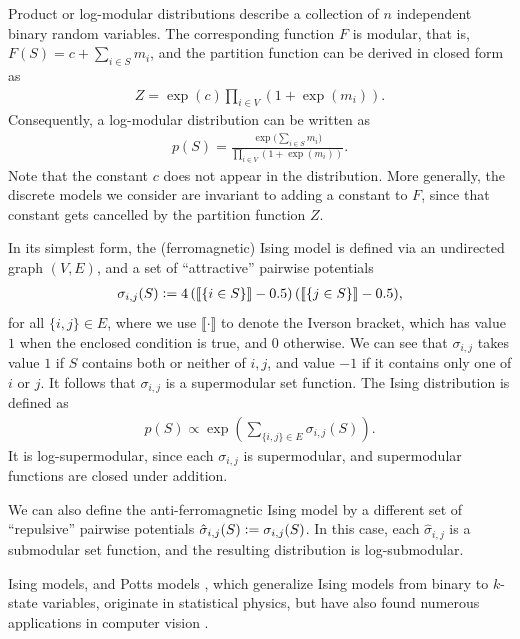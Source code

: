 \begin{example}
Product or log-modular distributions describe a collection of $n$ independent binary random variables.
The corresponding function $F$ is modular, that is, $F(S) = c + \sum_{i \in S} m_i$, and the partition function can be derived in closed form as
\begin{align*}
Z = \exp(c) \prod_{i \in V} \left( 1 + \exp(m_i) \right).
\end{align*}
Consequently, a log-modular distribution can be written as
\begin{align*}
  p(S) = \frac{\exp\big( \sum_{i \in S} m_i \big)}{\prod_{i \in V} \left( 1 + \exp(m_i) \right)}.
\end{align*}
Note that the constant $c$ does not appear in the distribution.
More generally, the discrete models we consider are invariant to adding a constant to $F$, since that constant gets cancelled by the partition function $Z$.
\end{example}

\begin{example}
In its simplest form, the (ferromagnetic) Ising model \citep{ising} is defined via an undirected graph $(V, E)$, and a set of ``attractive'' pairwise potentials
\begin{align*}
\sigma_{i,j}(S) \vcentcolon= 4\left(\llbracket\{i \in S\}\rrbracket - 0.5\right)(\llbracket\{j \in S\}\rrbracket - 0.5),
\end{align*}
for all $\{i, j\} \in E$, where we use $\llbracket \cdot \rrbracket$ to denote the Iverson bracket, which has value $1$ when the enclosed condition is true, and $0$ otherwise.
We can see that $\sigma_{i,j}$ takes value $1$ if $S$ contains both or neither of $i, j$, and value $-1$ if it contains only one of $i$ or $j$.
It follows that $\sigma_{i, j}$ is a supermodular set function.
The Ising distribution is defined as
\begin{align*}
p(S) \propto \exp\left(\sum_{\{i,j\} \in E} \sigma_{i,j}(S)\right).
\end{align*}
It is log-supermodular, since each $\sigma_{i,j}$ is supermodular, and supermodular functions are closed under addition.

We can also define the anti-ferromagnetic Ising model by a different set of ``repulsive'' pairwise potentials $\hat{\sigma}_{i,j}(S) \vcentcolon= \sigma_{i,j}(S)$.
In this case, each $\hat{\sigma}_{i,j}$ is a submodular set function, and the resulting distribution is log-submodular.

Ising models, and Potts models \citep{potts}, which generalize Ising models from binary to $k$-state variables, originate in statistical physics, but have also found numerous applications in computer vision \citep{wang13}.
\end{example}

